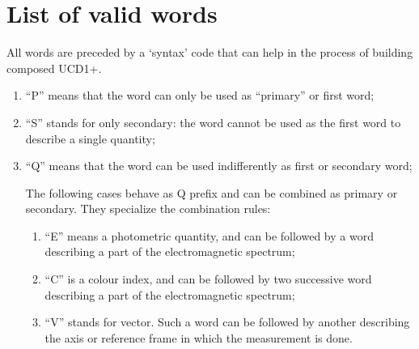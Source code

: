 \documentclass[11pt,a4paper]{ivoa}
\begin{document}
\section{List of valid words}
\label{sec:list}

All words are preceded by a `syntax' code that can help in the process of building composed UCD1+.
\begin{enumerate}
\item ``P'' means that the word can only be used as ``primary'' or first word;
\item ``S'' stands for only secondary: the word cannot be used as the first word to describe a 
single quantity;
\item ``Q'' means that the word can be used indifferently as first or secondary word;

The following cases behave as Q prefix and can be combined  as primary or secondary.
They specialize the combination rules:  
	\begin{enumerate}[label*=\arabic*.]
	\item ``E'' means a photometric quantity, and can be followed by a word describing a part of 
	the electromagnetic spectrum;
	\item ``C'' is a colour index, and can be followed by two successive word describing a part of 
	the electromagnetic spectrum;
	\item ``V'' stands for vector. Such a word can be followed by another describing the axis or 
	reference frame in which the measurement is done.
	\end{enumerate}
\end{enumerate}
\newpage
\end{document}
